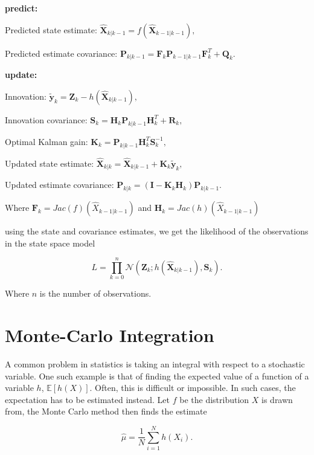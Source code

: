 \textbf{predict:}

Predicted state estimate: $\bm{\hat X}_{k|k-1} = f(\bm{\hat X}_{k-1|k-1} ),$

Predicted estimate covariance: $\textbf{P}_{k|k-1} = \textbf{F}_k\textbf{P}_{k-1|k-1} \textbf{F}_k^T + \textbf{Q}_k.$



\textbf{update:}

Innovation: $\bm{\tilde y}_{k} = \textbf{Z}_k - h(\bm{\hat X}_{k|k-1}),$

Innovation covariance: $\textbf{S}_k = \textbf{H}_k \textbf{P}_{k|k-1}\textbf{H}_k^T + \textbf{R}_k,$

Optimal Kalman gain: $\textbf{K}_k = \textbf{P}_{k|k-1} \textbf{H}_k^T \textbf{S}_k^{-1},$

Updated state estimate: $\bm{\hat X}_{k|k} = \bm{\hat X}_{k|k-1} + \textbf{K}_k \bm{\tilde y}_{k},$

Updated estimate covariance: $\textbf{P}_{k|k} = (\textbf{I} - \textbf{K}_k \textbf{H}_k)\textbf{P}_{k|k-1}.$



Where $\textbf{F}_k = Jac (f)(\hat{X}_{k-1|k-1})$ and $\textbf{H}_k = Jac( h)(\hat{X}_{k-1|k-1})$



using the state and covariance estimates, we get the likelihood of the observations in the state space model

$$L = \prod_{k=0}^n \mathcal{N}(\textbf{Z}_k; h(\hat{\textbf{X}}_{k|k-1}), \textbf{S}_k) \label{eq: EKF likelihood}.$$

Where $n$ is the number of observations.\parencite{kulikov_extended_2024}


\section{Monte-Carlo Integration}
\label{sec: Monte Carlo integration}
A common problem in statistics is taking an integral with respect to a stochastic variable. One such example is that of finding the expected value of a function of a variable $h$, $\mathbb{E}[h(X)]$. Often, this is difficult or impossible. In such cases, the expectation has to be estimated instead. Let $f$ be the distribution $X$ is drawn from, the Monte Carlo method then finds the estimate 

\begin{equation}
\hat{\mu} = \frac{1}{N} \sum_{i=1}^N h(X_i).
\label{eq: monte carlo estimator}    
\end{equation}
  
